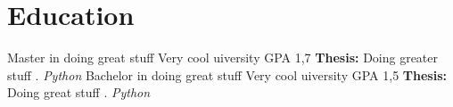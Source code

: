 
\section{Education}

{Master in doing great stuff}
{Very cool uiversity}
{}
{GPA 1,7}
{\textbf{Thesis:}
	\glqq Doing greater stuff  \grqq.
	\emph{Python }
}
{Bachelor in doing great stuff}
{Very cool uiversity}
{}
{GPA 1,5}
{\textbf{Thesis:}
	\glqq Doing great stuff  \grqq.
	\emph{Python }
}

